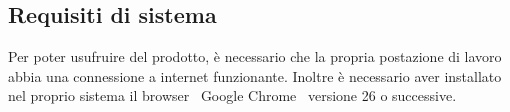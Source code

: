 {\subsection{Requisiti di sistema}{
Per poter usufruire del prodotto, è necessario che la propria postazione di lavoro abbia una connessione a internet funzionante. Inoltre è necessario aver installato nel proprio sistema il browser\g~ Google Chrome\g~ versione 26 o successive.

}
	
}
